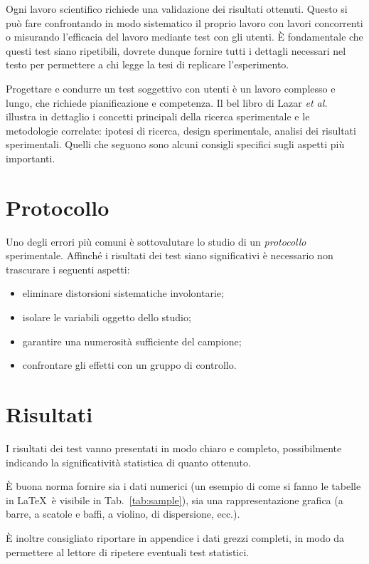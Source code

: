 \documentclass[12pt]{report}
\begin{document}
Ogni lavoro scientifico richiede una validazione dei risultati ottenuti. Questo si può fare confrontando in modo sistematico il proprio lavoro con lavori concorrenti o misurando l'efficacia del lavoro mediante test con gli utenti. \`E fondamentale che questi test siano ripetibili, dovrete dunque fornire tutti i dettagli necessari nel testo per permettere a chi legge la tesi di replicare l'esperimento.

Progettare e condurre un test soggettivo con utenti \`e un lavoro complesso e lungo, che richiede pianificazione e competenza. Il bel libro di Lazar {\em et al.}~\cite{lazar2017methods} illustra in dettaglio i concetti principali della ricerca sperimentale e le metodologie correlate: ipotesi di ricerca, design sperimentale, analisi dei risultati sperimentali. Quelli che seguono sono alcuni consigli specifici sugli aspetti pi\`u importanti.

\section{Protocollo}

Uno degli errori più comuni è sottovalutare lo studio di un \textit{protocollo} sperimentale. Affinché i risultati dei test siano significativi è necessario non trascurare i seguenti aspetti:

\begin{itemize}
	\item eliminare distorsioni sistematiche involontarie;
	\item isolare le variabili oggetto dello studio;
	\item garantire una numerosità sufficiente del campione;
	\item confrontare gli effetti con un gruppo di controllo.
\end{itemize}

\section{Risultati}

I risultati dei test vanno presentati in modo chiaro e completo, possibilmente indicando la significatività statistica di quanto ottenuto.

\`E buona norma fornire sia i dati numerici (un esempio di come si fanno le tabelle in \LaTeX\  è visibile in Tab.\ \ref{tab:sample}), sia una rappresentazione grafica (a barre, a scatole e baffi, a violino, di dispersione, ecc.).

\`E inoltre consigliato riportare in appendice i dati grezzi completi, in modo da permettere al lettore di ripetere eventuali test statistici.
\end{document}
